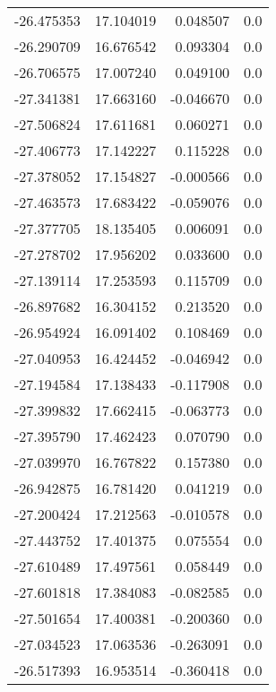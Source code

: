\begin{tabular}{rrrr}
      -26.475353 &        17.104019 &    0.048507 &   0.0 \\
      -26.290709 &        16.676542 &    0.093304 &   0.0 \\
      -26.706575 &        17.007240 &    0.049100 &   0.0 \\
      -27.341381 &        17.663160 &   -0.046670 &   0.0 \\
      -27.506824 &        17.611681 &    0.060271 &   0.0 \\
      -27.406773 &        17.142227 &    0.115228 &   0.0 \\
      -27.378052 &        17.154827 &   -0.000566 &   0.0 \\
      -27.463573 &        17.683422 &   -0.059076 &   0.0 \\
      -27.377705 &        18.135405 &    0.006091 &   0.0 \\
      -27.278702 &        17.956202 &    0.033600 &   0.0 \\
      -27.139114 &        17.253593 &    0.115709 &   0.0 \\
      -26.897682 &        16.304152 &    0.213520 &   0.0 \\
      -26.954924 &        16.091402 &    0.108469 &   0.0 \\
      -27.040953 &        16.424452 &   -0.046942 &   0.0 \\
      -27.194584 &        17.138433 &   -0.117908 &   0.0 \\
      -27.399832 &        17.662415 &   -0.063773 &   0.0 \\
      -27.395790 &        17.462423 &    0.070790 &   0.0 \\
      -27.039970 &        16.767822 &    0.157380 &   0.0 \\
      -26.942875 &        16.781420 &    0.041219 &   0.0 \\
      -27.200424 &        17.212563 &   -0.010578 &   0.0 \\
      -27.443752 &        17.401375 &    0.075554 &   0.0 \\
      -27.610489 &        17.497561 &    0.058449 &   0.0 \\
      -27.601818 &        17.384083 &   -0.082585 &   0.0 \\
      -27.501654 &        17.400381 &   -0.200360 &   0.0 \\
      -27.034523 &        17.063536 &   -0.263091 &   0.0 \\
      -26.517393 &        16.953514 &   -0.360418 &   0.0 \\

\end{tabular}
